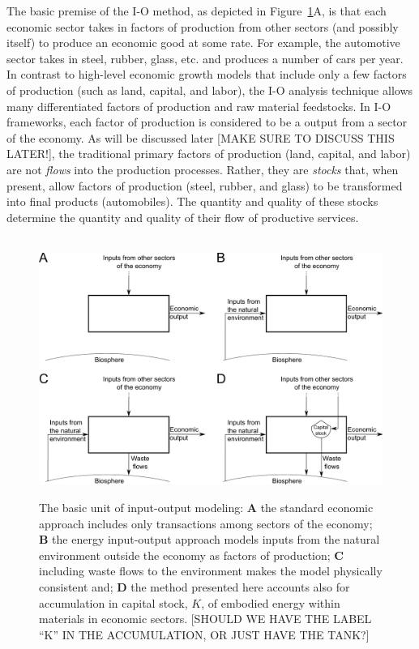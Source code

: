 The basic premise of the I-O method, 
as depicted in Figure~\ref{fig:basic_unit}A, 
is that each economic sector takes in factors of production 
from other sectors (and possibly itself) 
to produce an economic good at some rate. 
For example, the automotive sector takes in steel, rubber, glass, etc. 
and produces a number of cars per year. 
In contrast to high-level economic growth models 
that include only a few factors of production (such as land, capital, and labor), 
the I-O analysis technique allows many differentiated factors of production 
and raw material feedstocks.\cite{Costanza:1980ww} 
In I-O frameworks, each factor of production 
is considered to be a output from a sector of the economy. 
As will be discussed later [MAKE SURE TO DISCUSS THIS LATER!], 
the traditional primary factors of production (land, capital, and labor) 
are not \emph{flows} into the production processes. 
Rather, they are \emph{stocks} that, when present, 
allow factors of production (steel, rubber, and glass) 
to be transformed into final products (automobiles). 
The quantity and quality of these stocks 
determine the quantity and quality of their flow of productive services.

\begin{figure}[!ht]
\centering\
\includegraphics[width=\linewidth]{Part_0/Chapter_Introduction/images/Basic_unit_square.pdf}
\caption[The basic unit of input-output modeling]{The basic unit 
of input-output modeling: 
\textbf{A} the standard economic approach includes only transactions 
among sectors of the economy; 
\textbf{B} the energy input-output approach models inputs 
from the natural environment outside the economy as factors of production; 
\textbf{C} including waste flows to the environment makes the model physically consistent and;
\textbf{D} the method presented here accounts also for accumulation
in capital stock, $K$, of embodied energy within materials in economic sectors. 
[SHOULD WE HAVE THE LABEL ``K'' IN THE ACCUMULATION, OR JUST HAVE THE TANK?]}
\label{fig:basic_unit}
\end{figure}

